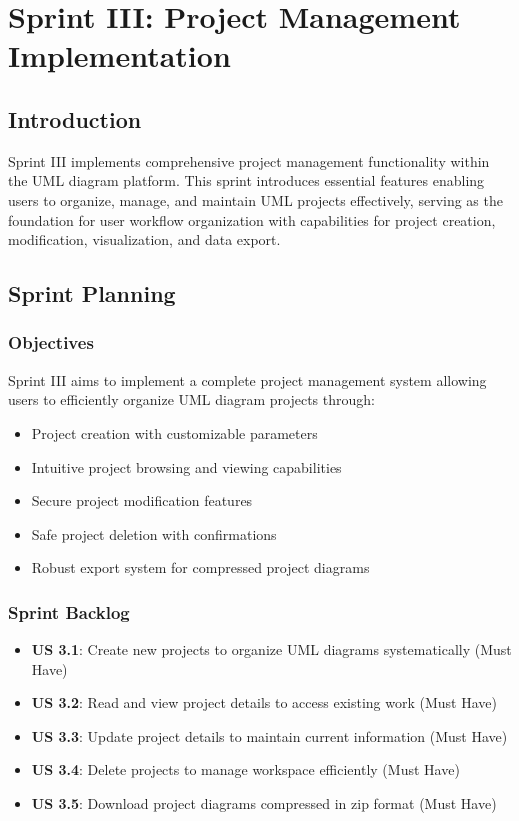 \chapter[Sprint III]{Sprint III: Project Management Implementation}

\section{Introduction}

Sprint III implements comprehensive project management functionality within the UML diagram platform. This sprint introduces essential features enabling users to organize, manage, and maintain UML projects effectively, serving as the foundation for user workflow organization with capabilities for project creation, modification, visualization, and data export.

\section{Sprint Planning}

\subsection{Objectives}
Sprint III aims to implement a complete project management system allowing users to efficiently organize UML diagram projects through:
\begin{itemize}
    \item Project creation with customizable parameters
    \item Intuitive project browsing and viewing capabilities
    \item Secure project modification features
    \item Safe project deletion with confirmations
    \item Robust export system for compressed project diagrams
\end{itemize}

\subsection{Sprint Backlog}
\begin{itemize}
\item \textbf{US 3.1}: Create new projects to organize UML diagrams systematically (Must Have)
\item \textbf{US 3.2}: Read and view project details to access existing work (Must Have)
\item \textbf{US 3.3}: Update project details to maintain current information (Must Have)
\item \textbf{US 3.4}: Delete projects to manage workspace efficiently (Must Have)
\item \textbf{US 3.5}: Download project diagrams compressed in zip format (Must Have)
\end{itemize}

